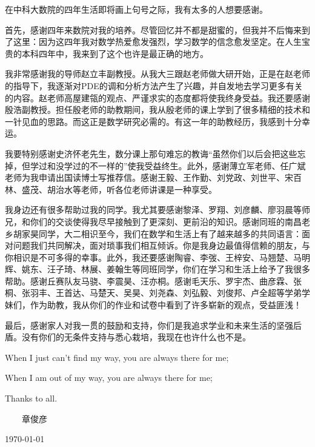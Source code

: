 ﻿
\begin{thanks}

在中科大数院的四年生活即将画上句号之际，我有太多的人想要感谢。

首先，感谢四年来数院对我的培养。尽管回忆并不都是甜蜜的，但我并不后悔来到了这里：因为这四年我对数学热爱愈发强烈，学习数学的信念愈发坚定。在人生宝贵的本科四年中，我来到了这个也许是最正确的地方。

我非常感谢我的导师赵立丰副教授。从我大三跟赵老师做大研开始，正是在赵老师的指导下，我逐渐对PDE的调和分析方法产生了兴趣，并自发地去学习更多有关的内容。赵老师高屋建瓴的观点、严谨求实的态度都将使我终身受益。我还要感谢殷浩副教授。担任殷老师的助教期间，我从殷老师的课上学到了很多精细的技术和一针见血的思路。而这正是数学研究必需的。有这一年的助教经历，我感到十分幸运。

我要特别感谢史济怀老先生，数分课上那句难忘的教诲“虽然你们以后会把这些忘掉，但学过和没学过的不一样的”使我受益终生。此外，感谢薄立军老师、任广斌老师为我申请出国读博士写推荐信。感谢王毅、王作勤、刘党政、刘世平、宋百林、盛茂、胡治水等老师，听各位老师讲课是一种享受。

我身边还有很多帮助过我的同学。我尤其要感谢黎泽、罗翔、刘彦麟、廖羽晨等师兄，和你们的交谈使得我尽早接触到了更深刻、更前沿的知识。感谢同班的南昌老乡胡家昊同学，大二相识至今，我们在数学和生活上有了越来越多的共同语言：面对问题我们共同解决，面对琐事我们相互倾诉。你是我身边最值得信赖的朋友，与你相识是不可多得的幸事。此外，我还要感谢陶睿、李弢、王梓安、马翘楚、马明辉、姚东、汪子琦、林展、姜翰生等同班同学，你们在学习和生活上给予了我很多帮助。感谢丘赛队友马骁、李震昊、汪亦桐。感谢毛天乐、罗宇杰、曲彦霖、张桐、张羽丰、王首达、马楚天、吴昊、刘尧森、刘弘毅、刘俊邦、卢全超等学弟学妹们，作为助教，我从你们的作业和试卷中看到了许多崭新的观点，受益匪浅！

最后，感谢家人对我一贯的鼓励和支持，你们是我追求学业和未来生活的坚强后盾。没有你们的无条件支持与悉心栽培，我现在也许什么也不是。

When I just can't find my way, you are always there for me;

When I am out of my way, you are always there for me;

Thanks to all.

\vskip 18pt

\begin{flushright}

~~~~章俊彦~~~~~~~~~~

\today

\end{flushright}

\end{thanks}
